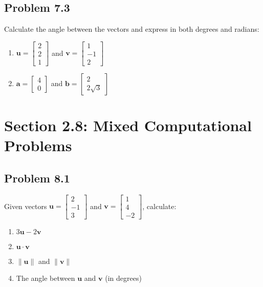 \documentclass{article}
\begin{document}
\subsection{Problem 7.3}
Calculate the angle between the vectors and express in both degrees and radians:
\begin{enumerate}
\item $\mathbf{u} = \begin{bmatrix} 2 \\ 2 \\ 1 \end{bmatrix}$ and $\mathbf{v} = \begin{bmatrix} 1 \\ -1 \\ 2 \end{bmatrix}$
\item $\mathbf{a} = \begin{bmatrix} 4 \\ 0 \end{bmatrix}$ and $\mathbf{b} = \begin{bmatrix} 2 \\ 2\sqrt{3} \end{bmatrix}$
\end{enumerate}

\section{Section 2.8: Mixed Computational Problems}

\subsection{Problem 8.1}
Given vectors $\mathbf{u} = \begin{bmatrix} 2 \\ -1 \\ 3 \end{bmatrix}$ and $\mathbf{v} = \begin{bmatrix} 1 \\ 4 \\ -2 \end{bmatrix}$, calculate:
\begin{enumerate}
\item $3\mathbf{u} - 2\mathbf{v}$
\item $\mathbf{u} \cdot \mathbf{v}$
\item $\|\mathbf{u}\|$ and $\|\mathbf{v}\|$
\item The angle between $\mathbf{u}$ and $\mathbf{v}$ (in degrees)
\end{enumerate}
\end{document}
